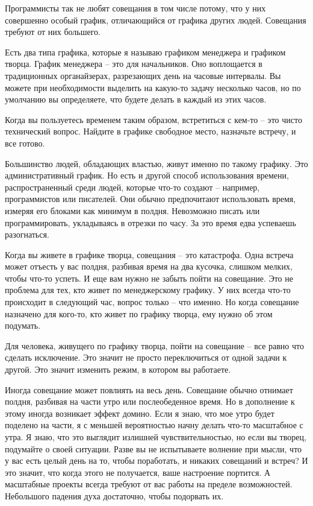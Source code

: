 \documentclass[ebook,12pt,oneside,openany]{memoir}
\begin{document}
\maketitle

Программисты так не любят совещания в том числе потому, что у них
совершенно особый график, отличающийся от графика других людей.
Совещания требуют от них большего.

Есть два типа графика, которые я называю графиком менеджера и графиком
творца. График менеджера – это для начальников. Оно воплощается в
традиционных органайзерах, разрезающих день на часовые интервалы. Вы
можете при необходимости выделить на какую-то задачу несколько часов,
но по умолчанию вы определяете, что будете делать в каждый из этих
часов.

Когда вы пользуетесь временем таким образом, встретиться с кем-то –
это чисто технический вопрос. Найдите в графике свободное место,
назначьте встречу, и все готово.

Большинство людей, обладающих властью, живут именно по такому графику.
Это административный график. Но есть и другой способ использования
времени, распространенный среди людей, которые что-то создают –
например, программистов или писателей. Они обычно предпочитают
использовать время, измеряя его блоками как минимум в полдня.
Невозможно писать или программировать, укладываясь в отрезки по часу.
За это время едва успеваешь разогнаться.

Когда вы живете в графике творца, совещания – это катастрофа. Одна
встреча может отъесть у вас полдня, разбивая время на два кусочка,
слишком мелких, чтобы что-то успеть. И еще вам нужно не забыть пойти
на совещание. Это не проблема для тех, кто живет по менеджерскому
графику. У них всегда что-то происходит в следующий час, вопрос только
– что именно. Но когда совещание назначено для кого-то, кто живет по
графику творца, ему нужно об этом подумать.

Для человека, живущего по графику творца, пойти на совещание – все
равно что сделать исключение. Это значит не просто переключиться от
одной задачи к другой. Это значит изменить режим, в котором вы
работаете.

Иногда совещание может повлиять на весь день. Совещание обычно
отнимает полдня, разбивая на части утро или послеобеденное время. Но в
дополнение к этому иногда возникает эффект домино. Если я знаю, что
мое утро будет поделено на части, я с меньшей вероятностью начну
делать что-то масштабное с утра. Я знаю, что это выглядит излишней
чувствительностью, но если вы творец, подумайте о своей ситуации.
Разве вы не испытываете волнение при мысли, что у вас есть целый день
на то, чтобы поработать, и никаких совещаний и встреч? И это значит,
что когда этого не получается, ваше настроение портится. А масштабные
проекты всегда требуют от вас работы на пределе возможностей.
Небольшого падения духа достаточно, чтобы подорвать их.
\end{document}
